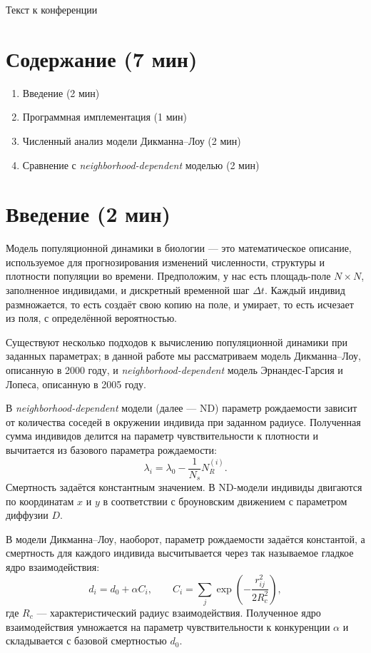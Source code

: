 \documentclass[12pt,a4paper]{article}
\begin{document}
\begin{center}
    {\LARGE Текст к конференции}
\end{center}

\section*{Содержание (7 мин)}
\begin{enumerate}
    \item Введение (2 мин)
    \item Программная имплементация (1 мин)
    \item Численный анализ модели Дикманна--Лоу (2 мин)
    \item Сравнение с \textit{neighborhood-dependent} моделью (2 мин)
\end{enumerate}

\section*{Введение (2 мин)}
Модель популяционной динамики в биологии --- это математическое описание, используемое для прогнозирования изменений численности, структуры и плотности популяции во времени. Предположим, у нас есть площадь-поле $N \times N$, заполненное индивидами, и дискретный временной шаг $\Delta t$. Каждый индивид размножается, то есть создаёт свою копию на поле, и умирает, то есть исчезает из поля, с определённой вероятностью.

Существуют несколько подходов к вычислению популяционной динамики при заданных параметрах; в данной работе мы рассматриваем модель Дикманна--Лоу, описанную в 2000 году, и \textit{neighborhood-dependent} модель Эрнандес-Гарсия и Лопеса, описанную в 2005 году.

В \textit{neighborhood-dependent} модели (далее --- ND) параметр рождаемости зависит от количества соседей в окружении индивида при заданном радиусе. Полученная сумма индивидов делится на параметр чувствительности к плотности и вычитается из базового параметра рождаемости:
\[
\lambda_i = \lambda_0 - \frac{1}{N_s} N_R^{(i)}.
\]
Смертность задаётся константным значением. В ND-модели индивиды двигаются по координатам $x$ и $y$ в соответствии с броуновским движением с параметром диффузии $D$.

В модели Дикманна--Лоу, наоборот, параметр рождаемости задаётся константой, а смертность для каждого индивида высчитывается через так называемое гладкое ядро взаимодействия:
\[
d_i = d_0 + \alpha C_i,
\qquad
C_i = \sum_j \exp\left(-\frac{r_{ij}^2}{2R_c^2}\right),
\]
где $R_c$ --- характеристический радиус взаимодействия. Полученное ядро взаимодействия умножается на параметр чувствительности к конкуренции $\alpha$ и складывается с базовой смертностью $d_0$.
\end{document}

